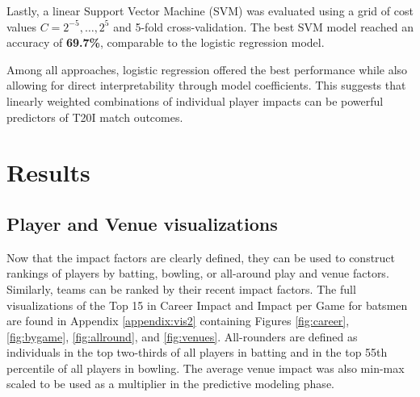 \documentclass{article}[12pt]
\begin{document}
Lastly, a linear Support Vector Machine (SVM) was evaluated using a grid of cost values $C = 2^{-5}, \dots, 2^5$ and 5-fold cross-validation. \parencite{e1071} The best SVM model reached an accuracy of \textbf{69.7\%}, comparable to the logistic regression model.

Among all approaches, logistic regression offered the best performance while also allowing for direct interpretability through model coefficients. This suggests that linearly weighted combinations of individual player impacts can be powerful predictors of T20I match outcomes.



\section{Results}

\subsection{Player and Venue visualizations}
Now that the impact factors are clearly defined, they can be used to construct rankings of players by batting, bowling, or all-around play and venue factors. Similarly, teams can be ranked by their recent impact factors. The full visualizations of the Top 15 in Career Impact and Impact per Game for batsmen are found in Appendix \ref{appendix:vis2} containing Figures \ref{fig:career}, \ref{fig:bygame}, \ref{fig:allround}, and \ref{fig:venues}. All-rounders are defined as individuals in the top two-thirds of all players in batting and in the top 55th percentile of all players in bowling. The average venue impact was also min-max scaled to be used as a multiplier in the predictive modeling phase.
\end{document}
